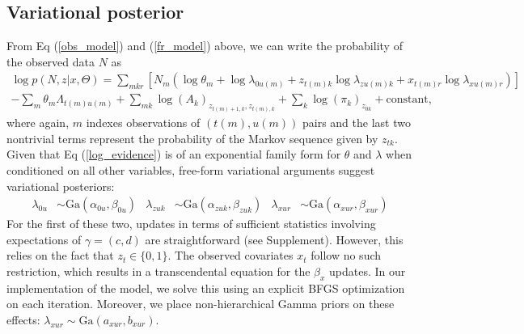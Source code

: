 \documentclass[10pt,letterpaper]{article}
\begin{document}
\subsection*{Variational posterior}
From Eq (\ref{obs_model}) and (\ref{fr_model}) above, we can write the probability of the observed data $N$ as
\begin{multline}
    \label{log_evidence}
    \log p(N, z|x, \Theta) = \sum_{mkr} \left[
        N_m \left( \log \theta_m +
            \log \lambda_{0u(m)} +
            z_{t(m) k} \log \lambda_{zu(m) k} +
            x_{t(m) r} \log \lambda_{xu(m) r}
            \right)
    \right] \\
    - \sum_m \theta_m \Lambda_{t(m) u(m)} +
    \sum_{mk} \log (A_k)_{z_{t(m)+1, k}, z_{t(m), k}} +
    \sum_k \log (\pi_k)_{z_{0k}} + \text{constant,}
\end{multline}
where again, $m$ indexes observations of $(t(m),u(m))$ pairs and the last two nontrivial terms represent the probability of the Markov sequence given by $z_{tk}$. Given that Eq (\ref{log_evidence}) is of an exponential family form for $\theta$ and $\lambda$ when conditioned on all other variables, free-form variational arguments \cite{Wainwright2008-ii} suggest variational posteriors:
\begin{align}
    \lambda_{0u} &\sim \text{Ga}(\alpha_{0u}, \beta_{0u}) &
    \lambda_{zuk} &\sim \text{Ga}(\alpha_{zuk}, \beta_{zuk}) &
    \lambda_{xur} &\sim \text{Ga}(\alpha_{xur}, \beta_{xur})
\end{align}
For the first of these two, updates in terms of sufficient statistics involving expectations of $\gamma = (c, d)$ are straightforward (see Supplement). However, this relies on the fact that $z_t \in \lbrace0, 1\rbrace$. The observed covariates $x_t$ follow no such restriction, which results in a transcendental equation for the $\beta_x$ updates. In our implementation of the model, we solve this using an explicit BFGS optimization on each iteration. Moreover, we place non-hierarchical Gamma priors on these effects: $\lambda_{xur} \sim \text{Ga}(a_{xur}, b_{xur})$.
\end{document}
